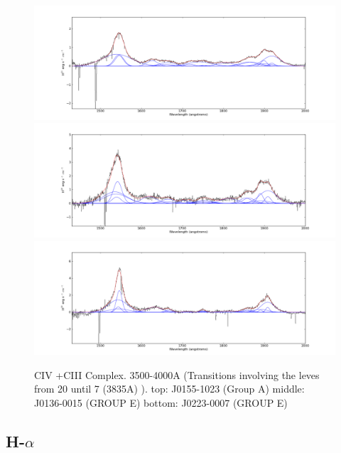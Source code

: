 \documentclass[usenatbib]{mn2e}
\begin{document}
\begin{figure}
\begin{center}
\includegraphics[width=0.46\linewidth,angle=0]{C_1.png}
\vspace{5mm}
\includegraphics[width=0.49\linewidth,angle=0]{C_17.png}\\
\includegraphics[width=0.46\linewidth,angle=0]{C_20.png}
\end{center} 
\caption{CIV +CIII Complex. 3500-4000A (Transitions involving  the leves from 20 until 7 (3835A) ).   top: J0155-1023 (Group A) middle: J0136-0015 (GROUP E) bottom: J0223-0007 (GROUP E) \label{fig:landscape}}   
\end{figure}




\newpage

\subsection{H-$\alpha$}
\end{document}

